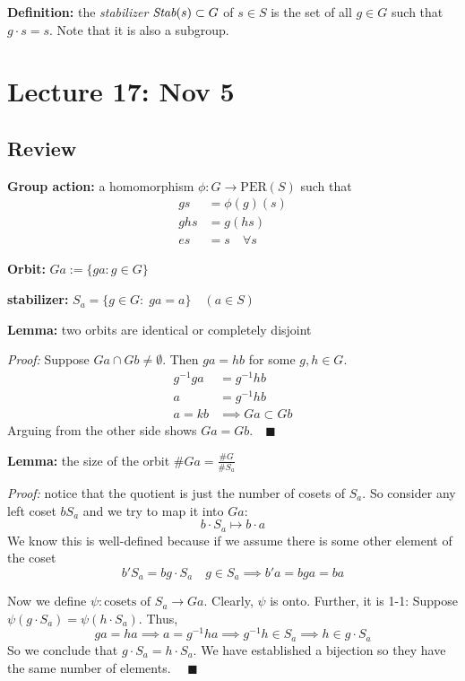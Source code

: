 \documentclass[12pt]{report}
\newcommand{\qed}{\quad \blacksquare}
\begin{document}
        \textbf{Definition:} the \emph{stabilizer} $\emph{Stab}(s) \subset G$ of $s\in S$ is the set of all $g \in G$ such that $g\cdot s = s$. Note that it is also a subgroup.

\section*{Lecture 17: Nov 5}
    \subsection*{Review}
        \textbf{Group action:} a homomorphism $\phi: G \to \text{PER}(S)$ such that 
        \begin{align*}
            gs &= \phi(g)(s)\\
            ghs &= g(hs)\\
            es &= s \quad \forall s
        \end{align*}

        \textbf{Orbit:} $Ga := \{ga : g\in G\}$

        \textbf{stabilizer:} $S_a = \{g\in G:\; ga = a\} \quad (a\in S)$ 

        \textbf{Lemma:} two orbits are identical or completely disjoint

        \emph{Proof:} Suppose $Ga \cap Gb \neq \emptyset$. Then $ga = hb$ for some $g, h \in G$.
        \begin{align*}
            g^{-1}ga &= g^{-1}hb\\
            a &= g^{-1}hb\\
            a = kb &\implies Ga \subset Gb
        \end{align*}
        Arguing from the other side shows $Ga = Gb. \qed$

        \textbf{Lemma:} the size of the orbit $\#Ga = \frac{\#G}{\#S_a}$

        \emph{Proof:} notice that the quotient is just the number of cosets of $S_a$. So consider any left coset $bS_a$ and we try to map it into $Ga$:
        \[b\cdot S_a \mapsto b\cdot a\]
        We know this is well-defined because if we assume there is some other element of the coset
        \[b'S_a = bg\cdot S_a \quad g\in S_a \implies b'a = bga = ba \]

        Now we define $\psi: \text{cosets of } S_a \to Ga$. Clearly, $\psi$ is onto. Further, it is 1-1: Suppose $\psi(g\cdot S_a) = \psi(h \cdot S_a)$. Thus,
        \[ga = ha \implies a = g^{-1}ha \implies g^{-1}h \in S_a \implies h \in g\cdot S_a\]
        So we conclude that $g\cdot S_a = h\cdot S_a$. We have established a bijection so they have the same number of elements. $\qed$ 
\end{document}
